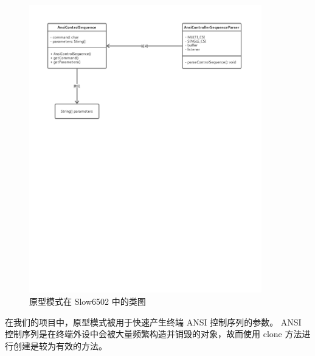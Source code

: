 \begin{figure}[H]
    \centering
    \includegraphics[width=0.9\textwidth]{figures/原型模式.pdf}
    \caption{原型模式在 Slow6502 中的类图}
\end{figure}

在我们的项目中，原型模式被用于快速产生终端 ANSI 控制序列的参数。 ANSI 控制序列是在终端外设中会被大量频繁构造并销毁的对象，故而使用 clone 方法进行创建是较为有效的方法。

